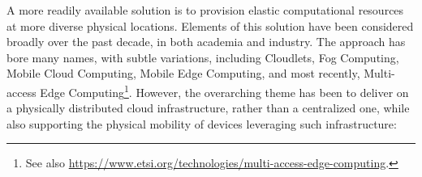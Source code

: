 





A more readily available solution is to provision elastic
computational resources at more diverse physical locations. Elements
of this solution have been considered broadly over the past decade, in
both academia and
industry\cite{2018-Survey-on-MEC-for-IoT-Realization,
2020-Edge-Computing-for-Extreme-Reliability-and-Scalability}. The
approach has bore many names, with subtle variations, including
Cloudlets\cite{2009-The-Case-for-VM-Based-Cloudlets}, Fog
Computing\cite{2012-Fog-Computing-and-Its-Role-in-IoT}, Mobile Cloud
Computing\cite{2013-MCC-A-Survey}, Mobile Edge
Computing\cite{2015-ETSI-MEC-A-key-tech-towards-5G}, and most
recently, Multi-access Edge
Computing\cite{2016-TelecomTV-MEC}\footnote{See also
\url{https://www.etsi.org/technologies/multi-access-edge-computing}.}.
However, the overarching theme has been to deliver on a physically
distributed cloud infrastructure, rather than a centralized
one\cite{2011-Distributed-Cloud, 2015-Distributed-Cloud-Dagstuhl,
2018-Ericsson-TechReview-Distributed-Cloud}, while also supporting the
physical mobility of devices leveraging such
infrastructure\cite{2018-MAGA}:

